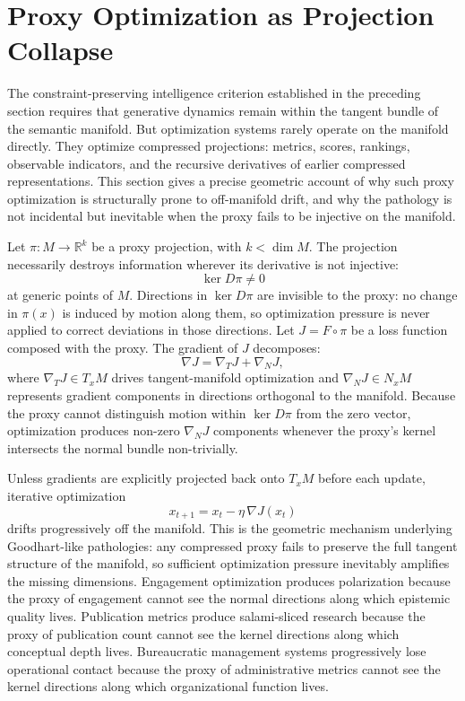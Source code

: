 \documentclass[11pt,a4paper,twocolumn]{article}
\begin{document}

\section{Proxy Optimization as Projection Collapse}

The constraint-preserving intelligence criterion established
in the preceding section requires that generative dynamics
remain within the tangent bundle of the semantic manifold.
But optimization systems rarely operate on the manifold
directly. They optimize compressed projections: metrics,
scores, rankings, observable indicators, and the recursive
derivatives of earlier compressed representations. This
section gives a precise geometric account of why such proxy
optimization is structurally prone to off-manifold drift,
and why the pathology is not incidental but inevitable when
the proxy fails to be injective on the manifold.

Let $\pi : M \to \mathbb{R}^k$ be a proxy projection, with
$k < \dim M$. The projection necessarily destroys information
wherever its derivative is not injective:
\[
\ker D\pi \neq 0
\]
at generic points of $M$. Directions in $\ker D\pi$ are
invisible to the proxy: no change in $\pi(x)$ is induced by
motion along them, so optimization pressure is never applied
to correct deviations in those directions. Let $J = F \circ \pi$
be a loss function composed with the proxy. The gradient of
$J$ decomposes:
\[
\nabla J = \nabla_T J + \nabla_N J,
\]
where $\nabla_T J \in T_x M$ drives tangent-manifold
optimization and $\nabla_N J \in N_x M$ represents gradient
components in directions orthogonal to the manifold. Because
the proxy cannot distinguish motion within $\ker D\pi$ from
the zero vector, optimization produces non-zero $\nabla_N J$
components whenever the proxy's kernel intersects the normal
bundle non-trivially.

Unless gradients are explicitly projected back onto $T_x M$
before each update, iterative optimization
\[
x_{t+1} = x_t - \eta\,\nabla J(x_t)
\]
drifts progressively off the manifold. This is the geometric
mechanism underlying Goodhart-like pathologies: any compressed
proxy fails to preserve the full tangent structure of the
manifold, so sufficient optimization pressure inevitably
amplifies the missing dimensions. Engagement optimization
produces polarization because the proxy of engagement cannot
see the normal directions along which epistemic quality lives.
Publication metrics produce salami-sliced research because
the proxy of publication count cannot see the kernel
directions along which conceptual depth lives. Bureaucratic
management systems progressively lose operational contact
because the proxy of administrative metrics cannot see the
kernel directions along which organizational function lives.
\end{document}
